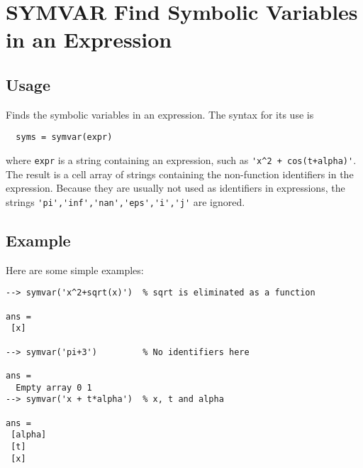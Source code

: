 \section{SYMVAR Find Symbolic Variables in an Expression}

\subsection{Usage}

Finds the symbolic variables in an expression.  The syntax for its
use is 
\begin{verbatim}
  syms = symvar(expr)
\end{verbatim}
where \verb|expr| is a string containing an expression, such as
\verb|'x^2 + cos(t+alpha)'|.  The result is a cell array of strings
containing the non-function identifiers in the expression.  Because
they are usually not used as identifiers in expressions, the strings
 \verb|'pi','inf','nan','eps','i','j'| are ignored.
\subsection{Example}

Here are some simple examples:
\begin{verbatim}
--> symvar('x^2+sqrt(x)')  % sqrt is eliminated as a function

ans = 
 [x] 

--> symvar('pi+3')         % No identifiers here

ans = 
  Empty array 0 1
--> symvar('x + t*alpha')  % x, t and alpha

ans = 
 [alpha] 
 [t] 
 [x] 
\end{verbatim}
